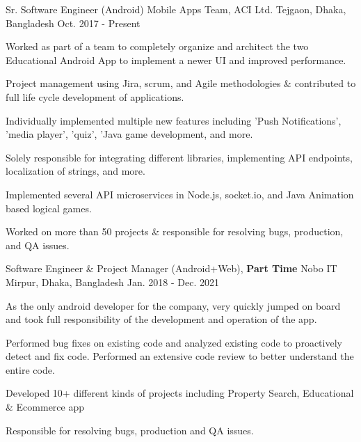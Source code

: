 

\begin{cventries}

  \cventry
    {Sr. Software Engineer (Android)} %
    {Mobile Apps Team, ACI Ltd.} %
    {Tejgaon, Dhaka, Bangladesh} %
    {Oct. 2017 - Present } %
    {
      \begin{cvitems} %
        \item {Worked as part of a team to completely organize and architect the two Educational Android App to implement a newer UI and improved performance.}
         \item {Project management using Jira, scrum, and Agile methodologies \& contributed to full life cycle development of applications.}
        \item {Individually implemented multiple new features including 'Push Notifications', 'media player', 'quiz', 'Java game development, and more.}
        \item {Solely responsible for integrating different libraries, implementing API endpoints, localization of strings, and more.}
        \item {Implemented several API microservices in Node.js, socket.io, and Java Animation based logical games.}
        \item {Worked on more than 50 projects \& responsible for resolving bugs, production, and QA issues.}
      \end{cvitems}
    }

  \cventry
    {Software Engineer \& Project Manager (Android+Web), \textbf{Part Time}} %
    {Nobo IT} %
    {Mirpur, Dhaka, Bangladesh} %
    {Jan. 2018 - Dec. 2021} %
    {
      \begin{cvitems} %
        \item {As the only android developer for the company, very quickly jumped on board and took full responsibility of the development and operation of the app.}
        \item {Performed bug fixes on existing code and analyzed existing code to proactively detect and fix code. Performed an extensive code review to better understand the entire code.}
        \item {Developed 10+ different kinds of projects including Property Search, Educational \& Ecommerce app}
        \item {Responsible for resolving bugs, production and QA issues.}
      \end{cvitems}
    }


\end{cventries}
